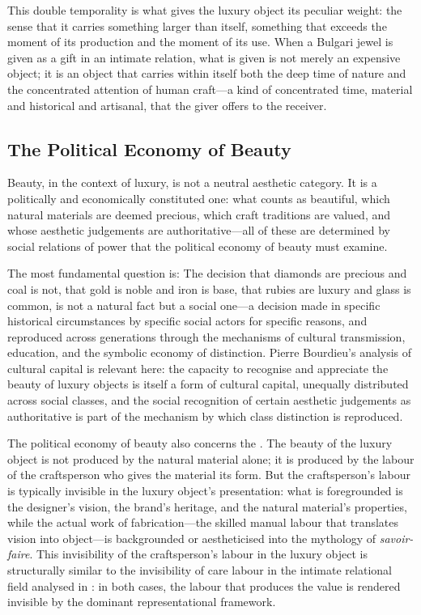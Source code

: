 This double temporality is what gives the luxury object its peculiar weight: the sense that it carries something larger than itself, something that exceeds the moment of its production and the moment of its use. When a Bulgari jewel is given as a gift in an intimate relation, what is given is not merely an expensive object; it is an object that carries within itself both the deep time of nature and the concentrated attention of human craft---a kind of concentrated time, material and historical and artisanal, that the giver offers to the receiver.

\subsection{The Political Economy of Beauty}
\label{p16:subsec:beauty_pe}

\noindent
Beauty, in the context of luxury, is not a neutral aesthetic category. It is a politically and economically constituted one: what counts as beautiful, which natural materials are deemed precious, which craft traditions are valued, and whose aesthetic judgements are authoritative---all of these are determined by social relations of power that the political economy of beauty must examine.

The most fundamental question is:  The decision that diamonds are precious and coal is not, that gold is noble and iron is base, that rubies are luxury and glass is common, is not a natural fact but a social one---a decision made in specific historical circumstances by specific social actors for specific reasons, and reproduced across generations through the mechanisms of cultural transmission, education, and the symbolic economy of distinction. Pierre Bourdieu's analysis of cultural capital \parencite{bourdieu1984} is relevant here: the capacity to recognise and appreciate the beauty of luxury objects is itself a form of cultural capital, unequally distributed across social classes, and the social recognition of certain aesthetic judgements as authoritative is part of the mechanism by which class distinction is reproduced.

The political economy of beauty also concerns the . The beauty of the luxury object is not produced by the natural material alone; it is produced by the labour of the craftsperson who gives the material its form. But the craftsperson's labour is typically invisible in the luxury object's presentation: what is foregrounded is the designer's vision, the brand's heritage, and the natural material's properties, while the actual work of fabrication---the skilled manual labour that translates vision into object---is backgrounded or aestheticised into the mythology of \emph{savoir-faire}. This invisibility of the craftsperson's labour in the luxury object is structurally similar to the invisibility of care labour in the intimate relational field analysed in  \parencite{paperxv}: in both cases, the labour that produces the value is rendered invisible by the dominant representational framework.

